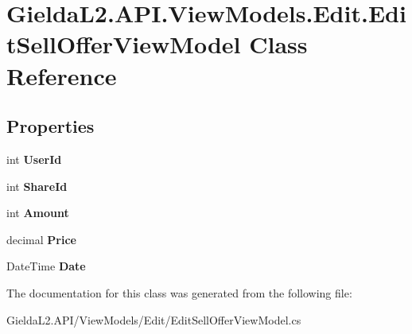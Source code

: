 \hypertarget{class_gielda_l2_1_1_a_p_i_1_1_view_models_1_1_edit_1_1_edit_sell_offer_view_model}{}\section{Gielda\+L2.\+A\+P\+I.\+View\+Models.\+Edit.\+Edit\+Sell\+Offer\+View\+Model Class Reference}
\label{class_gielda_l2_1_1_a_p_i_1_1_view_models_1_1_edit_1_1_edit_sell_offer_view_model}
\subsection*{Properties}
\begin{DoxyCompactItemize}
\item 
\mbox{\label{class_gielda_l2_1_1_a_p_i_1_1_view_models_1_1_edit_1_1_edit_sell_offer_view_model_af97c4cb47e70658cb3d6b7b52e28dba8}} 
int {\bfseries User\+Id}
\item 
\mbox{\label{class_gielda_l2_1_1_a_p_i_1_1_view_models_1_1_edit_1_1_edit_sell_offer_view_model_a0c1df35136c9d8690480a554606816f8}} 
int {\bfseries Share\+Id}
\item 
\mbox{\label{class_gielda_l2_1_1_a_p_i_1_1_view_models_1_1_edit_1_1_edit_sell_offer_view_model_a4e5032e8c2cc95ed15a23625c52e1e53}} 
int {\bfseries Amount}
\item 
\mbox{\label{class_gielda_l2_1_1_a_p_i_1_1_view_models_1_1_edit_1_1_edit_sell_offer_view_model_ad0aadac0a469caa9309e5f2edd879cb5}} 
decimal {\bfseries Price}
\item 
\mbox{\label{class_gielda_l2_1_1_a_p_i_1_1_view_models_1_1_edit_1_1_edit_sell_offer_view_model_a7acecaa0a9ecf77ea13b015e58ece112}} 
Date\+Time {\bfseries Date}
\end{DoxyCompactItemize}


The documentation for this class was generated from the following file\+:\begin{DoxyCompactItemize}
\item 
Gielda\+L2.\+A\+P\+I/\+View\+Models/\+Edit/Edit\+Sell\+Offer\+View\+Model.\+cs\end{DoxyCompactItemize}
